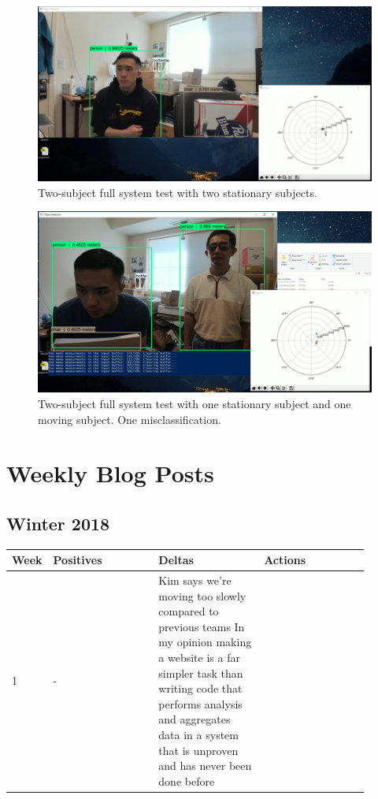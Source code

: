 \documentclass[onecolumn, draftclsnofoot,10pt, compsoc]{IEEEtran}
\makeatletter
\newcommand\captionof[1]{\def\@captype{#1}\caption}
\makeatother
\begin{document}
\begin{singlespace}
		\begin{figure}[H]
		\includegraphics[scale=0.4]{final2.PNG}
		\captionof{figure}{Two-subject full system test with two stationary subjects.}
		\label{final2}
		\end{figure}

		\begin{figure}[H]
		\includegraphics[scale=0.4]{final1.PNG}
		\captionof{figure}{Two-subject full system test with one stationary subject and one moving subject. One misclassification.}
		\label{final1}
		\end{figure}

	\section{Weekly Blog Posts}
		\subsection{Winter 2018}
		\begin{longtable}{|l|p{0.3\linewidth}|p{0.3\linewidth}|p{0.3\linewidth}|}\hline \textbf{Week} & \textbf{Positives} & \textbf{Deltas} & \textbf{Actions}\\\hline
		1 	&
			-
			&
				Kim says we're moving too slowly compared to previous teams
				In my opinion making a website is a far simpler task than writing code that performs analysis  and aggregates data in a system that is unproven and has never been done before


\end{longtable}
\end{singlespace}
\end{document}

